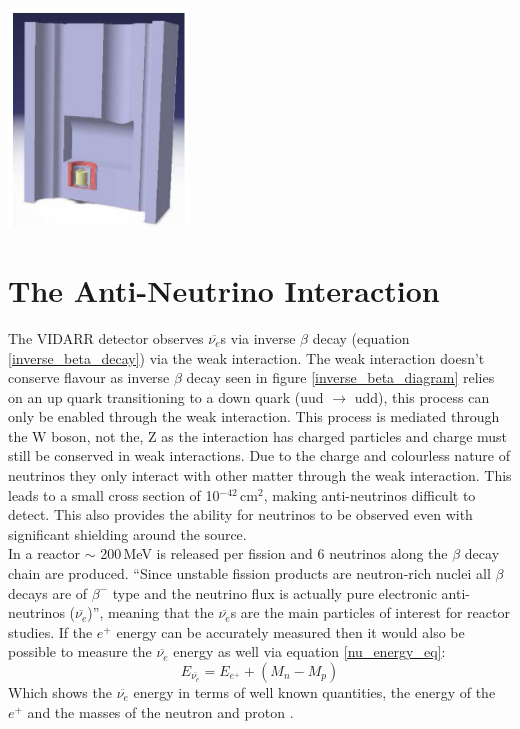 \documentclass[12pt,a4paper]{article}
\newenvironment{Figure}
  {\par\medskip\noindent\minipage{\linewidth}}
  {\endminipage\par\medskip}
\begin{document}
\begin{Figure}
 \centering
 \includegraphics[height=58mm]{doubleC_deep.png}
 \label{DeepChooz}
\end{Figure}

\section{The Anti-Neutrino Interaction} %
The VIDARR detector observes $\overline{\nu_e}$s via inverse $\beta$ decay (equation {\ref{inverse_beta_decay}}) via the weak interaction. The weak interaction doesn't conserve flavour as inverse $\beta$ decay seen in figure \ref{inverse_beta_diagram} relies on an up quark transitioning to a down quark (uud $\rightarrow$ udd), this process can only be enabled through the weak interaction. This process is mediated through the W boson, not the, Z as the interaction has charged particles and charge must still be conserved in weak interactions. Due to the charge and colourless nature of neutrinos they only interact with other matter through the weak interaction. This leads to a small cross section of 10$^{-42}$\,cm$^2$\cite{vogel_beacom_nu_cross}, making anti-neutrinos difficult to detect. This also provides the ability for neutrinos to be observed even with significant shielding around the source. \\

In a reactor $\sim$ 200\,MeV is released per fission and 6 neutrinos along the $\beta$ decay chain are produced. ``Since unstable fission products are neutron-rich nuclei all $\beta$ decays are of $\beta^-$ type and the neutrino flux is actually pure electronic anti-neutrinos ($\overline{\nu_e}$)''\cite{muller_reactors}, meaning that the $\overline{\nu_e}$s are the main particles of interest for reactor studies. If the $e^+$ energy can be accurately measured then it would also be possible to measure the $\overline{\nu_e}$ energy as well via equation \ref{nu_energy_eq}:
\begin{equation}
 E_{\overline{\nu_e}} = E_{e^+} + (M_n - M_p) 
\label{nu_energy_eq}
\end{equation}
Which shows the $\overline{\nu_e}$ energy in terms of well known quantities, the energy of the $e^+$ and the masses of the neutron and proton \cite{vogel_beacom_nu_cross}. 
\end{document}
